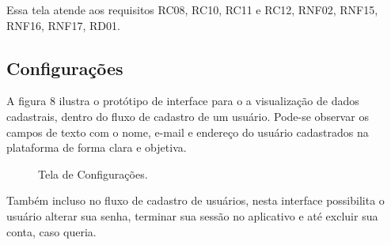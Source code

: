 \documentclass[12pt]{article}
\begin{document}
Essa tela atende aos requisitos RC08, RC10, RC11 e RC12, RNF02, RNF15, RNF16, RNF17, RD01.

\subsection{Configurações}\label{subsec:Secconfig}
A figura 8 ilustra o protótipo de interface para o a visualização de dados cadastrais, dentro do fluxo de cadastro de um usuário. Pode-se observar os campos de texto com o nome, e-mail e endereço do usuário cadastrados na plataforma de forma clara e objetiva.

\begin{figure}[h!]
  \caption{Tela de Configurações.}
  \label{fig:configuration}
\end{figure}

Também incluso no fluxo de cadastro de usuários, nesta interface possibilita o usuário alterar sua senha, terminar sua sessão no aplicativo e até excluir sua conta, caso queria.

\vfill%
\pagebreak%

\end{document}
